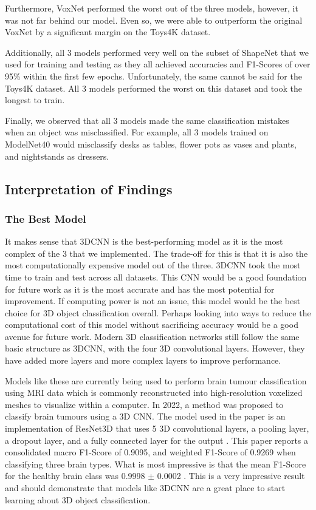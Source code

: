 \documentclass[conference]{IEEEtran}
\begin{document}
Furthermore, VoxNet performed the worst out of the three models, however, it was not far behind our model. Even so, we were able to outperform the original VoxNet by a significant margin on the Toys4K dataset.

Additionally, all 3 models performed very well on the subset of ShapeNet that we used for training and testing as they all achieved accuracies and F1-Scores of over 95\% within the first few epochs. Unfortunately, the same cannot be said for the Toys4K dataset. All 3 models performed the worst on this dataset and took the longest to train.

Finally, we observed that all 3 models made the same classification mistakes when an object was misclassified. For example, all 3 models trained on ModelNet40 would misclassify desks as tables, flower pots as vases and plants, and nightstands as dressers.


\subsection{Interpretation of Findings}
\subsubsection{The Best Model}
It makes sense that 3DCNN is the best-performing model as it is the most complex of the 3 that we implemented. The trade-off for this is that it is also the most computationally expensive model out of the three. 3DCNN took the most time to train and test across all datasets. This CNN would be a good foundation for future work as it is the most accurate and has the most potential for improvement. If computing power is not an issue, this model would be the best choice for 3D object classification overall. Perhaps looking into ways to reduce the computational cost of this model without sacrificing accuracy would be a good avenue for future work. Modern 3D classification networks still follow the same basic structure as 3DCNN, with the four 3D convolutional layers. However, they have added more layers and more complex layers to improve performance.

Models like these are currently being used to perform brain tumour classification using MRI data which is commonly reconstructed into high-resolution voxelized meshes to visualize within a computer. In 2022, a method was proposed to classify brain tumours using a 3D CNN. The model used in the paper is an implementation of ResNet3D that uses 5 3D convolutional layers, a pooling layer, a dropout layer, and a fully connected layer for the output \cite{chatterjee2022}. This paper reports a consolidated macro F1-Score of 0.9095, and weighted F1-Score of 0.9269 \cite{chatterjee2022} when classifying three brain types. What is most impressive is that the mean F1-Score for the healthy brain class was 0.9998 $\pm$ 0.0002 \cite{chatterjee2022}. This is a very impressive result and should demonstrate that models like 3DCNN are a great place to start learning about 3D object classification.
\end{document}
